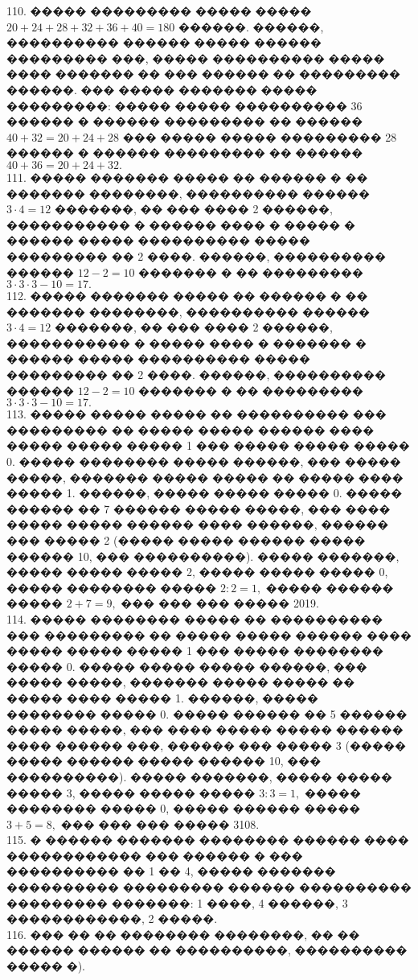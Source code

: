 \documentclass[12pt]{article}
\begin{document}
110. ����� ��������� ����� ����� $20+24+28+32+36+40=180$ ������. ������, ���������� ������ ����� ������ ��������� ���, ����� ���������� ����� ���� ������� �� ��� ������ �� ��������� ������. ��� ����� ������� ����� ���������: ����� ����� ���������� 36 ������ � ������ ��������� �� ������ $40+32=20+24+28$ ��� ����� ����� ��������� 28 ������ � ������ ��������� �� ������ $40+36=20+24+32.$\\
111. ����� ������� ����� �� ������ � �� ������� ��������, ���������� ������ $3\cdot4=12$ �������, �� ��� ���� 2 ������, ����������� � ������ ���� � ����� � ������ ����� ���������� ����� ��������� �� 2 ����. ������, ���������� ������ $12-2=10$ ������� � �� ��������� $3\cdot3\cdot3-10=17.$\\
112. ����� ������� ����� �� ������ � �� ������� ��������, ���������� ������ $3\cdot4=12$ �������, �� ��� ���� 2 ������, ����������� � ����� ���� � ������� � ������ ����� ���������� ����� ��������� �� 2 ����. ������, ���������� ������ $12-2=10$ ������� � �� ��������� $3\cdot3\cdot3-10=17.$\\
113. ����� ����� ����� �� ���������� ��� ��������� �� ����� ����� ������ ���� ����� ����� ����� 1 ��� ����� ����� ����� 0. ����� �������� ����� ������, ��� ����� �����, ������� ����� ����� �� ����� ���� ����� 1. ������, ����� ����� ����� 0. ����� ������ �� 7 ������ ����� �����, ��� ���� ����� ����� ������ ���� ������, ������ ��� ����� 2 (����� ����� ������ ����� ������ 10, ��� ����������). ����� �������, ����� ����� ����� 2, ����� ����� ����� 0, ����� �������� ����� $2:2=1,$ ����� ������ ����� $2+7=9,$ ��� ��� ��� ����� 2019.\\
114. ����� �������� ����� �� ���������� ��� ��������� �� ����� ����� ������ ���� ����� ����� ����� 1 ��� ����� �������� ����� 0. ����� ����� ����� ������, ��� ����� �����, ������� ����� ����� �� ����� ���� ����� 1. ������, ����� �������� ����� 0. ����� ������ �� 5 ������ ����� �����, ��� ���� ����� ����� ������ ���� ������ ���, ������ ��� ����� 3 (����� ����� ������ ����� ������ 10, ��� ����������). ����� �������, ����� ����� ����� 3, ����� ����� ����� $3:3=1,$ ����� �������� ����� 0, ����� ������ ����� $3+5=8,$ ��� ��� ��� ����� 3108.\\
115. � ������ ������� �������� ������ ���� ������������ ��� ������ � ��� ���������� �� 1 �� 4, ����� ������� ���������� ��������� ������ ���������� ��������� �������: 1 ����, 4 ������, 3 ������������, 2 �����.\\
116. ��� �� �� �������� ��������, �� �� ������ ������ �� ����������, ���������� ����� �).\\
\end{document}
